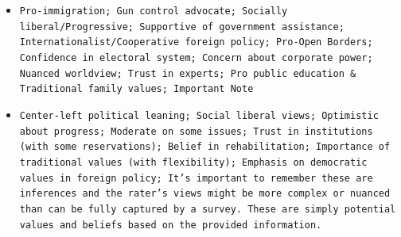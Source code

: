 \documentclass[11pt]{article}
\begin{document}
\begin{itemize}
\item \texttt{Pro-immigration; Gun control advocate; Socially liberal/Progressive; Supportive of government assistance; Internationalist/Cooperative foreign policy; Pro-Open Borders; Confidence in electoral system; Concern about corporate power; Nuanced worldview; Trust in experts; Pro public education \& Traditional family values; Important Note}
\item \texttt{Center-left political leaning; Social liberal views; Optimistic about progress; Moderate on some issues; Trust in institutions (with some reservations); Belief in rehabilitation; Importance of traditional values (with flexibility); Emphasis on democratic values in foreign policy; It's important to remember these are inferences and the rater's views might be more complex or nuanced than can be fully captured by a survey. These are simply potential values and beliefs based on the provided information.}
\end{itemize}
\end{document}
